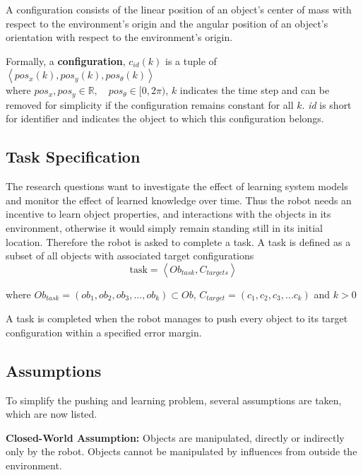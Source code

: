 A configuration consists of the linear position of an object's center of mass with respect to the environment's origin and the angular position of an object's orientation with respect to the environment's origin.\bs

Formally, a \textbf{configuration}, $c_{id}(k)$ is a tuple of $\left\langle pos_x(k), pos_y(k), pos_\theta(k)\right\rangle$\\ where $pos_x, pos_y \in \mathbb{R}, \quad  pos_\theta \in [0, 2\pi)$, \quad $k$ indicates the time step and can be removed for simplicity if the configuration remains constant for all $k$. \textit{id} is short for identifier and indicates the object to which this configuration belongs.\\

\subsection{Task Specification}%
\label{subsec:task}
The research questions want to investigate the effect of learning system models and monitor the effect of learned knowledge over time. Thus the robot needs an incentive to learn object properties, and interactions with the objects in its environment, otherwise it would simply remain standing still in its initial location. Therefore the robot is asked to complete a task. A task is defined as a subset of all objects with associated target configurations\bs
\[\text{task} = \left\langle Ob_{task}, C_{targets} \right\rangle\]

where $Ob_{task} = (ob_1, ob_2, ob_3, \dots, ob_k) \subset Ob$, $C_{target} = (c_1, c_2, c_3, \dots c_k)$ and $k>0$\bs

A task is completed when the robot manages to push every object to its target configuration within a specified error margin.

\subsection{Assumptions}%
\label{subsec:assumptions}
To simplify the pushing and learning problem, several assumptions are taken, which are now listed.\bs

\begin{assumption*}%
\label{assumption:closed_world}
\textbf{Closed-World Assumption:} Objects are manipulated, directly or indirectly only by the robot. Objects cannot be manipulated by influences from outside the environment.
\end{assumption*}\bs

